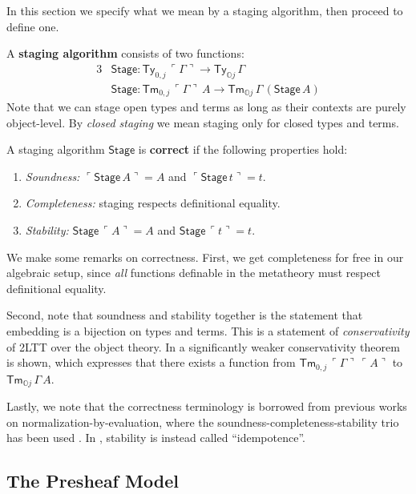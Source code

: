 \documentclass[acmsmall]{acmart}
\newcommand{\msf}[1]{\mathsf{#1}}
\newcommand{\mbb}[1]{\mathbb{#1}}
\newcommand{\mbbo}{\mbb{O}}
\newcommand{\Ty}{\msf{Ty}}
\newcommand{\Tm}{\msf{Tm}}
\newcommand{\emb}[1]{\ulcorner#1\urcorner}
\newcommand{\Stage}{\msf{Stage}}
\theoremstyle{remark}
\begin{document}
In this section we specify what we mean by a staging algorithm, then proceed to
define one.

\begin{definition}\label{def:staging}
A \textbf{staging algorithm} consists of two functions:
  \begin{alignat*}{3}
    & \Stage : \Ty_{0,j}\,\emb{\Gamma} \to \Ty_{\mbbo j}\,\Gamma \\
    & \Stage : \Tm_{0,j}\,\emb{\Gamma}\,A \to \Tm_{\mbbo j}\,\Gamma\,(\Stage\,A)
  \end{alignat*}
Note that we can stage open types and terms as long as their contexts are purely
object-level. By \emph{closed staging} we mean staging only for closed types and
terms.
\end{definition}
\begin{definition}
  A staging algorithm $\Stage$ is \textbf{correct} if the following properties hold:
  \begin{enumerate}
  \item \emph{Soundness:} $\emb{\Stage\,A} = A$ and $\emb{\Stage\,t} = t$.
  \item \emph{Completeness:} staging respects definitional equality.
  \item \emph{Stability:} $\Stage\,\emb{A} = A$ and $\Stage\,\emb{t} = t$.
  \end{enumerate}
\end{definition}
We make some remarks on correctness. First, we get completeness for free in our
algebraic setup, since \emph{all} functions definable in the metatheory must
respect definitional equality.

Second, note that soundness and stability together is the statement that
embedding is a bijection on types and terms. This is a statement of
\emph{conservativity} of 2LTT over the object theory. In \cite{twolevel} a
significantly weaker conservativity theorem is shown, which expresses that there
exists a function from $\Tm_{0,j}\,\emb{\Gamma}\,\emb{A}$ to $\Tm_{\mbbo
  j}\,\Gamma\,A$.

Lastly, we note that the correctness terminology is borrowed from previous works
on normalization-by-evaluation, where the soundness-completeness-stability trio
has been used \cite{altenkirch1995categorical,altenkirch2016normalisation}. In
\cite{cubicalnbe}, stability is instead called ``idempotence''.

\subsection{The Presheaf Model}
\end{document}
